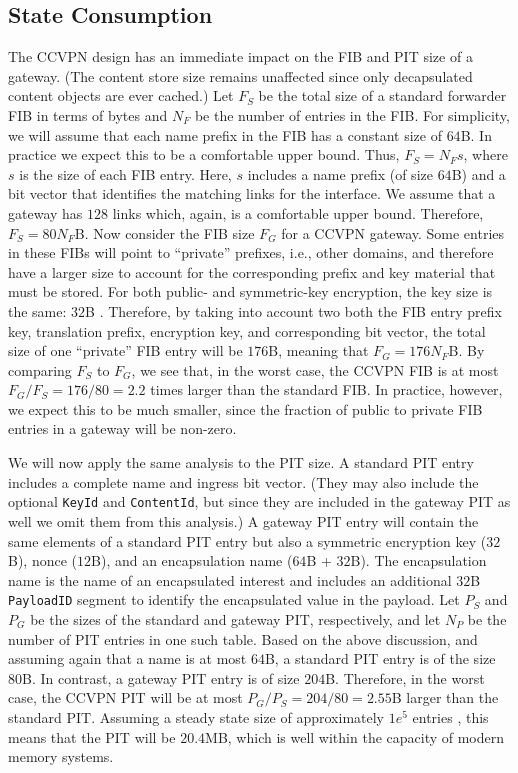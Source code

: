 \documentclass[conference,letterpaper,10pt]{IEEEtran}
\begin{document}
\subsection{State Consumption}
The CCVPN design has an immediate impact on the FIB and PIT size of a gateway.
(The content store size remains unaffected since only decapsulated content objects
are ever cached.) Let $F_S$ be the total size of a standard forwarder 
FIB in terms of bytes and
$N_F$ be the number of entries in the FIB. For simplicity, we will assume that
each name prefix in the FIB has a constant size of $64$B. In practice we expect
this to be a comfortable upper bound. Thus, $F_S = N_Fs$, where $s$ is the size of
each FIB entry. Here, $s$ includes a name prefix (of size $64$B) and a bit vector
that identifies the matching links for the interface. We assume that a gateway has
$128$ links which, again, is a comfortable upper bound. Therefore, $F_S = 80N_F$B.
Now consider the FIB size $F_G$ for a CCVPN gateway. Some entries in these FIBs will
point to ``private'' prefixes, i.e., other domains, and therefore have a larger size
to account for the corresponding prefix and key material that must be stored. 
For both public- and symmetric-key encryption, the key size is the same: $32$B \cite{sodium}. 
Therefore, by taking into account two both the FIB entry prefix key, translation
prefix, encryption key, and corresponding bit vector, the total size of one ``private''
FIB entry will be $176$B, meaning that $F_G = 176N_F$B. By comparing $F_S$ to $F_G$, we 
see that, in the worst case, the CCVPN FIB is at most $F_G/F_S = 176/80 = 2.2$ times larger
than the standard FIB. In practice, however, we expect this to be much smaller, since the
fraction of public to private FIB entries in a gateway will be non-zero. 

We will now apply the same analysis to the PIT size. A standard PIT entry includes a 
complete name and ingress bit vector. (They may also include the optional {\tt KeyId}
and {\tt ContentId}, but since they are included in the gateway PIT as well we omit them
from this analysis.) A gateway PIT entry will contain the same elements of a standard
PIT entry but also a symmetric encryption key ($32$B), nonce ($12$B), and an 
encapsulation name ($64$B + $32$B).
The encapsulation name is the name of an encapsulated interest and includes an additional
$32$B {\tt PayloadID} segment to identify the encapsulated value in the payload. Let 
$P_S$ and $P_G$ be the sizes of the standard and gateway PIT, respectively, and let $N_P$ 
be the number of PIT entries in one such table. Based on the above discussion, and assuming
again that a name is at most $64$B, a standard PIT entry is of the size $80$B. In contrast,
a gateway PIT entry is of size $204$B. Therefore, in the worst case, the CCVPN PIT
will be at most $P_G / P_S = 204/80 = 2.55$B larger than the standard PIT. Assuming 
a steady state size of approximately $1e^5$ entries \cite{carofiglio2015pending}, 
this means that the PIT will be $20.4$MB, which is well within the capacity of 
modern memory systems. 
\end{document}
